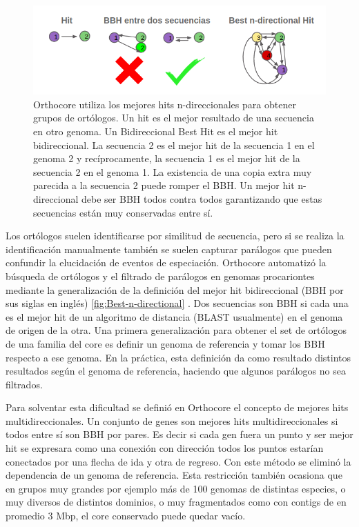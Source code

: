 \documentclass[]{article}
\begin{document}
\begin{figure}[h!tbp]
\centering
\includegraphics[angle = 0,scale = .55]{chapter1/Best-n-directional.png}
\caption[Los mejores hits n-direccionales generalizan a los $Bidirectional~Best~Hits$]{\footnotesize{Orthocore utiliza los mejores hits n-direccionales para obtener grupos de ortólogos. Un hit es el mejor resultado de una secuencia en otro genoma. Un Bidireccional Best Hit es el mejor hit bidireccional. La secuencia 2 es el mejor hit de la secuencia 1 en el genoma 2 y recíprocamente, la secuencia 1 es el mejor hit de la secuencia 2 en el genoma 1. La existencia de una copia extra muy parecida a la secuencia 2 puede romper el BBH. Un mejor hit n-direccional debe ser BBH todos contra todos garantizando que estas secuencias están muy conservadas entre sí.}}
\label{fig:Best-n-directional}
\end{figure}

Los ortólogos suelen identificarse por similitud de secuencia, pero si
se realiza la identificación manualmente también se suelen capturar
parálogos que pueden confundir la elucidación de eventos de especiación.
Orthocore automatizó la búsqueda de ortólogos y el filtrado de parálogos
en genomas procariontes mediante la generalización de la definición del
mejor hit bidireccional (BBH por sus siglas en inglés)
\autoref{fig:Best-n-directional} . Dos secuencias son BBH si cada una es
el mejor hit de un algoritmo de distancia (BLAST usualmente) en el
genoma de origen de la otra. Una primera generalización para obtener el
set de ortólogos de una familia del core es definir un genoma de
referencia y tomar los BBH respecto a ese genoma. En la práctica, esta
definición da como resultado distintos resultados según el genoma de
referencia, haciendo que algunos parálogos no sea filtrados.

Para solventar esta dificultad se definió en Orthocore el concepto de
mejores hits multidireccionales. Un conjunto de genes son mejores hits
multidireccionales si todos entre sí son BBH por pares. Es decir si cada
gen fuera un punto y ser mejor hit se expresara como una conexión con
dirección todos los puntos estarían conectados por una flecha de ida y
otra de regreso. Con este método se eliminó la dependencia de un genoma
de referencia. Esta restricción también ocasiona que en grupos muy
grandes por ejemplo más de 100 genomas de distintas especies, o muy
diversos de distintos dominios, o muy fragmentados como con contigs de
en promedio 3 Mbp, el core conservado puede quedar vacío.
\end{document}
